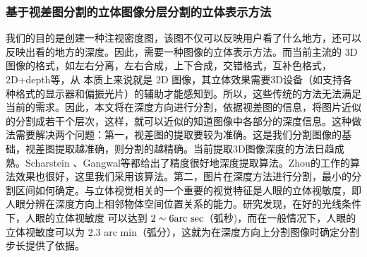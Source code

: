 \subsubsection{基于视差图分割的立体图像分层分割的立体表示方法}
\label{sec:stereoscopicimagerepresentation}
我们的目的是创建一种注视密度图，该图不仅可以反映用户看了什么地方，还可以反映出看的地方的深度。因此，需要一种图像的立体表示方法。而当前主流的 3D 图像的格式，如左右分离，左右合成，上下合成，交错格式，互补色格式，2D+depth等，从 本质上来说就是 2D 图像，其立体效果需要3D设备（如支持各种格式的显示器和偏振光片）的辅助才能感知到。所以，这些传统的方法无法满足当前的需求。因此，本文将在深度方向进行分割，依据视差图的信息，将图片近似的分割成若干个层次，这样，就可以近似的知道图像中各部分的深度信息。这种做法需要解决两个问题：第一，视差图的提取要较为准确。这是我们分割图像的基础，视差图提取越准确，则分割的越精确。当前提取3D图像深度的方法日趋成熟。Scharstein\parencite{scharstein2002taxonomy} 、Gangwal\parencite{gangwal2009depth}等都给出了精度很好地深度提取算法。Zhou\parencite{zhou2015depth}的工作的算法效果也很好，这里我们采用该算法。第二，图片在深度方法进行分割，最小的分割区间如何确定。与立体视觉相关的一个重要的视觉特征是人眼的立体视敏度，即人眼分辨在深度方向上相邻物体空间位置关系的能力。研究发现，在好的光线条件下，人眼的立体视敏度 可以达到 $2\sim6{\mathop{\rm arc\ sec}\nolimits} $（弧秒)，而在一般情况下，人眼的立体视敏度可以为 2.3 arc min（弧分）\parencite{coutant1993population}，这就为在深度方向上分割图像时确定分割步长提供了依据。


